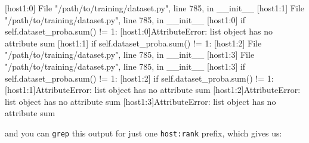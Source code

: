 \documentclass[
]{report}
\newenvironment{Shaded}{\begin{snugshade}}{\end{snugshade}}
\newcommand{\ErrorTok}[1]{\textcolor[rgb]{0.68,0.00,0.00}{#1}}
\newcommand{\ExtensionTok}[1]{\textcolor[rgb]{0.00,0.23,0.31}{#1}}
\newcommand{\KeywordTok}[1]{\textcolor[rgb]{0.00,0.23,0.31}{#1}}
\newcommand{\NormalTok}[1]{\textcolor[rgb]{0.00,0.23,0.31}{#1}}
\newcommand{\StringTok}[1]{\textcolor[rgb]{0.13,0.47,0.30}{#1}}
\begin{document}
\begin{Shaded}
\begin{Highlighting}[]
\ExtensionTok{[host1:0]}\NormalTok{  File }\StringTok{"/path/to/training/dataset.py"}\NormalTok{, line 785, in \_\_init\_\_}
\ExtensionTok{[host1:1]}\NormalTok{  File }\StringTok{"/path/to/training/dataset.py"}\NormalTok{, line 785, in \_\_init\_\_}
\ExtensionTok{[host1:0]}\NormalTok{    if self.dataset\_proba.sum}\ErrorTok{(}\KeywordTok{)} \ExtensionTok{!=}\NormalTok{ 1:}
\ExtensionTok{[host1:0]AttributeError:} \StringTok{\textquotesingle{}list\textquotesingle{}}\NormalTok{ object has no attribute }\StringTok{\textquotesingle{}sum\textquotesingle{}}
\ExtensionTok{[host1:1]}\NormalTok{    if self.dataset\_proba.sum}\ErrorTok{(}\KeywordTok{)} \ExtensionTok{!=}\NormalTok{ 1:}
\ExtensionTok{[host1:2]}\NormalTok{  File }\StringTok{"/path/to/training/dataset.py"}\NormalTok{, line 785, in \_\_init\_\_}
\ExtensionTok{[host1:3]}\NormalTok{  File }\StringTok{"/path/to/training/dataset.py"}\NormalTok{, line 785, in \_\_init\_\_}
\ExtensionTok{[host1:3]}\NormalTok{    if self.dataset\_proba.sum}\ErrorTok{(}\KeywordTok{)} \ExtensionTok{!=}\NormalTok{ 1:}
\ExtensionTok{[host1:2]}\NormalTok{    if self.dataset\_proba.sum}\ErrorTok{(}\KeywordTok{)} \ExtensionTok{!=}\NormalTok{ 1:}
\ExtensionTok{[host1:1]AttributeError:} \StringTok{\textquotesingle{}list\textquotesingle{}}\NormalTok{ object has no attribute }\StringTok{\textquotesingle{}sum\textquotesingle{}}
\ExtensionTok{[host1:2]AttributeError:} \StringTok{\textquotesingle{}list\textquotesingle{}}\NormalTok{ object has no attribute }\StringTok{\textquotesingle{}sum\textquotesingle{}}
\ExtensionTok{[host1:3]AttributeError:} \StringTok{\textquotesingle{}list\textquotesingle{}}\NormalTok{ object has no attribute }\StringTok{\textquotesingle{}sum\textquotesingle{}}
\end{Highlighting}
\end{Shaded}

and you can \texttt{grep} this output for just one \texttt{host:rank}
prefix, which gives us:

\begin{Shaded}
\end{Shaded}
\end{document}
